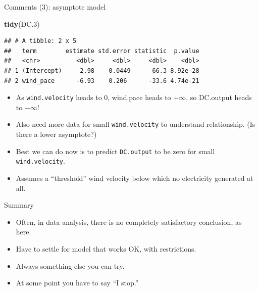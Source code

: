 \documentclass[ignorenonframetext,]{beamer}
\newenvironment{Shaded}{\begin{snugshade}}{\end{snugshade}}
\newcommand{\FloatTok}[1]{\textcolor[rgb]{0.00,0.00,0.81}{#1}}
\newcommand{\KeywordTok}[1]{\textcolor[rgb]{0.13,0.29,0.53}{\textbf{#1}}}
\newcommand{\NormalTok}[1]{#1}
\providecommand{\tightlist}{%
  \setlength{\itemsep}{0pt}\setlength{\parskip}{0pt}}
\begin{document}
\begin{frame}[fragile]{Comments (3): asymptote model}
\protect\hypertarget{comments-3-asymptote-model}{}

\small

\begin{Shaded}
\begin{Highlighting}[]
\KeywordTok{tidy}\NormalTok{(DC}\FloatTok{.3}\NormalTok{)}
\end{Highlighting}
\end{Shaded}

\begin{verbatim}
## # A tibble: 2 x 5
##   term        estimate std.error statistic  p.value
##   <chr>          <dbl>     <dbl>     <dbl>    <dbl>
## 1 (Intercept)     2.98    0.0449      66.3 8.92e-28
## 2 wind_pace      -6.93    0.206      -33.6 4.74e-21
\end{verbatim}

\normalsize

\begin{itemize}
\tightlist
\item
  As \texttt{wind.velocity} heads to 0, wind.pace heads to \(+\infty\),
  so DC.output heads to \(−\infty\)!
\item
  Also need more data for small \texttt{wind.velocity} to understand
  relationship. (Is there a lower asymptote?)
\item
  Best we can do now is to predict \texttt{DC.output} to be zero for
  small \texttt{wind.velocity}.
\item
  Assumes a ``threshold'' wind velocity below which no electricity
  generated at all.
\end{itemize}

\end{frame}

\begin{frame}{Summary}
\protect\hypertarget{summary}{}

\begin{itemize}
\tightlist
\item
  Often, in data analysis, there is no completely satisfactory
  conclusion, as here.
\item
  Have to settle for model that works OK, with restrictions.
\item
  Always something else you can try.
\item
  At some point you have to say ``I stop.''
\end{itemize}

\end{frame}
\end{document}
